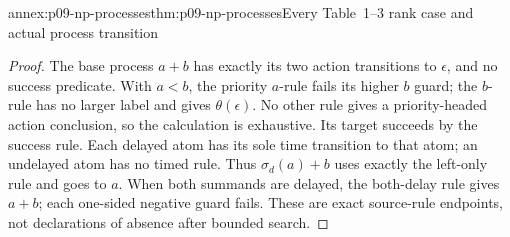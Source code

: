 \begin{annexitem}{annex:p09-np-processes}{thm:p09-np-processes}{Every Table~1--3 rank case and actual process transition}
\begin{proof}
The base process \(a+b\) has exactly its two action transitions
to \(\epsilon\), and no success predicate. With \(a<b\),
the priority \(a\)-rule fails its higher \(b\) guard; the
\(b\)-rule has no larger label and gives \(\theta(\epsilon)\).
No other rule gives a priority-headed action conclusion, so the
calculation is exhaustive. Its target succeeds by the success rule.
Each delayed atom has its sole time transition to that atom;
an undelayed atom has no timed rule. Thus \(\sigma_d(a)+b\)
uses exactly the left-only rule and goes to \(a\). When both
summands are delayed, the both-delay rule gives \(a+b\); each
one-sided negative guard fails. These are exact source-rule
endpoints, not declarations of absence after bounded search.
\end{proof}
\end{annexitem}
